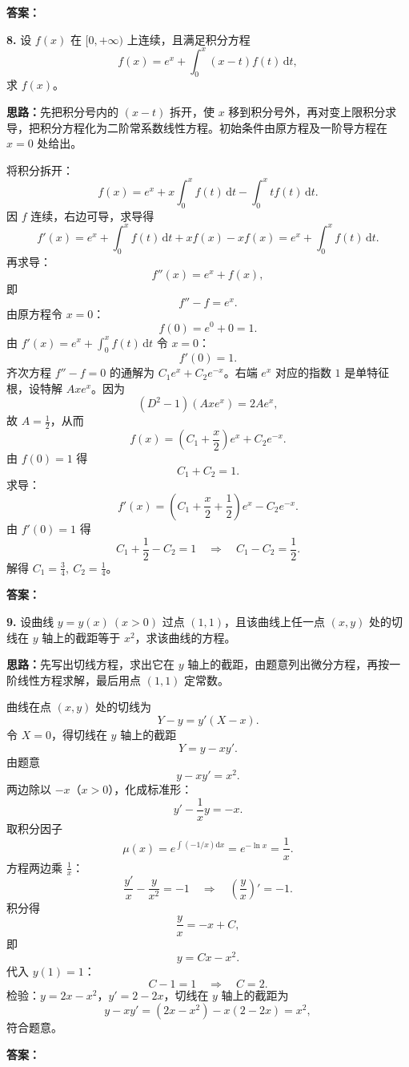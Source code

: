 \textbf{答案：}

\else \answerarea[10] \fi%
\textbf{8.} 设 $f(x)$ 在 $[0,+\infty)$ 上连续，且满足积分方程
\[
f(x)=e^x+\int_0^x (x-t)f(t)\,\mathrm{d}t,
\]
求 $f(x)$。

\ifshowsolutions%
\textbf{思路：}先把积分号内的 $(x-t)$ 拆开，使 $x$ 移到积分号外，再对变上限积分求导，把积分方程化为二阶常系数线性方程。初始条件由原方程及一阶导方程在 $x=0$ 处给出。

将积分拆开：
\[
f(x)=e^x+x\int_0^x f(t)\,\mathrm{d}t-\int_0^x tf(t)\,\mathrm{d}t.
\]
因 $f$ 连续，右边可导，求导得
\[
f'(x)=e^x+\int_0^x f(t)\,\mathrm{d}t+xf(x)-xf(x)
=e^x+\int_0^x f(t)\,\mathrm{d}t.
\]
再求导：
\[
f''(x)=e^x+f(x),
\]
即
\[
f''-f=e^x.
\]
由原方程令 $x=0$：
\[
f(0)=e^0+0=1.
\]
由 $f'(x)=e^x+\int_0^x f(t)\,\mathrm{d}t$ 令 $x=0$：
\[
f'(0)=1.
\]
齐次方程 $f''-f=0$ 的通解为 $C_1e^x+C_2e^{-x}$。右端 $e^x$ 对应的指数 $1$ 是单特征根，设特解 $Axe^x$。因为
\[
(D^2-1)(Axe^x)=2Ae^x,
\]
故 $A=\frac12$，从而
\[
f(x)=\left(C_1+\frac{x}{2}\right)e^x+C_2e^{-x}.
\]
由 $f(0)=1$ 得
\[
C_1+C_2=1.
\]
求导：
\[
f'(x)=\left(C_1+\frac{x}{2}+\frac12\right)e^x-C_2e^{-x}.
\]
由 $f'(0)=1$ 得
\[
C_1+\frac12-C_2=1
\quad\Longrightarrow\quad
C_1-C_2=\frac12.
\]
解得 $C_1=\frac34,\ C_2=\frac14$。

\textbf{答案：}

\else \answerarea[10] \fi%
\textbf{9.} 设曲线 $y=y(x)\ (x>0)$ 过点 $(1,1)$，且该曲线上任一点 $(x,y)$ 处的切线在 $y$ 轴上的截距等于 $x^2$，求该曲线的方程。

\ifshowsolutions%
\textbf{思路：}先写出切线方程，求出它在 $y$ 轴上的截距，由题意列出微分方程，再按一阶线性方程求解，最后用点 $(1,1)$ 定常数。

曲线在点 $(x,y)$ 处的切线为
\[
Y-y=y'(X-x).
\]
令 $X=0$，得切线在 $y$ 轴上的截距
\[
Y=y-xy'.
\]
由题意
\[
y-xy'=x^2.
\]
两边除以 $-x$（$x>0$），化成标准形：
\[
y'-\frac1xy=-x.
\]
取积分因子
\[
\mu(x)=e^{\int(-1/x)\mathrm{d}x}=e^{-\ln x}=\frac1x.
\]
方程两边乘 $\frac1x$：
\[
\frac{y'}{x}-\frac{y}{x^2}=-1
\quad\Longrightarrow\quad
\left(\frac{y}{x}\right)'=-1.
\]
积分得
\[
\frac{y}{x}=-x+C,
\]
即
\[
y=Cx-x^2.
\]
代入 $y(1)=1$：
\[
C-1=1\quad\Longrightarrow\quad C=2.
\]
检验：$y=2x-x^2$，$y'=2-2x$，切线在 $y$ 轴上的截距为
\[
y-xy'=(2x-x^2)-x(2-2x)=x^2,
\]
符合题意。

\textbf{答案：}

\else \answerarea[8] \fi%
